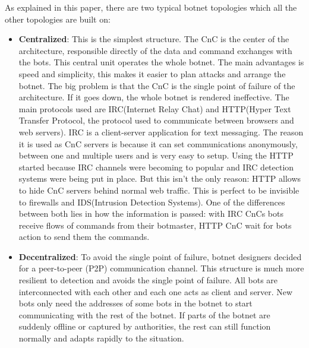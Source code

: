 As explained in this paper, there are two typical botnet topologies which all the other topologies are built on:
\begin{itemize}[noitemsep]
\item \textbf{Centralized}: This is the simplest structure. The CnC is the center of the architecture, responsible directly of the data and command exchanges with the bots. This central unit operates the whole botnet. The main advantages is speed and simplicity, this makes it easier to plan attacks and arrange the botnet. The big problem is that the CnC is the single point of failure of the architecture. If it goes down, the whole botnet is rendered ineffective. The main protocols used are IRC(Internet Relay Chat) and HTTP(Hyper Text Transfer Protocol, the protocol used to communicate between browsers and web servers). IRC is a client-server application for text messaging. The reason it is used as CnC servers is because it can set communications anonymously, between one and multiple users and is very easy to setup. Using the HTTP started because IRC channels were becoming to popular and IRC detection systems were being put in place. But this isn't the only reason: HTTP allows to hide CnC servers behind normal web traffic. This is perfect to be invisible to firewalls and IDS(Intrusion Detection Systems). One of the differences between both lies in how the information is passed: with IRC CnCs bots receive flows of commands from their botmaster, HTTP CnC wait for bots action to send them the commands.
\item \textbf{Decentralized}: To avoid the single point of failure, botnet designers decided for a peer-to-peer (P2P) communication channel. This structure is much more resilient to detection and avoids the single point of failure. All bots are interconnected with each other and each one acts as client and server. New bots only need the addresses of some bots in the botnet to start communicating with the rest of the botnet. If parts of the botnet are suddenly offline or captured by authorities, the rest can still function normally and adapts rapidly to the situation.
\end{itemize}


